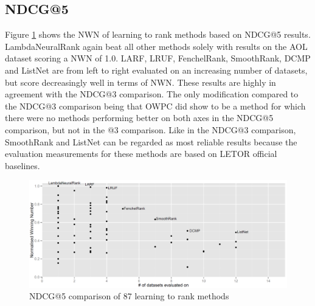 \documentclass{llncs}
\begin{document}
\subsection{NDCG@5}
Figure \ref{fig:normalized_winning_number_ndcg5} shows the NWN of learning to rank methods based on NDCG@5 results. LambdaNeuralRank again beat all other methods solely with results on the AOL dataset scoring a NWN of 1.0. LARF, LRUF, FenchelRank, SmoothRank, DCMP and ListNet are from left to right evaluated on an increasing number of datasets, but score decreasingly well in terms of NWN. These results are highly in agreement with the NDCG@3 comparison. The only modification compared to the NDCG@3 comparison being that OWPC did show to be a method for which there were no methods performing better on both axes in the NDCG@5 comparison, but not in the @3 comparison. Like in the NDCG@3 comparison, SmoothRank and ListNet can be regarded as most reliable results because the evaluation measurements for these methods are based on LETOR official baselines.
\vspace{-0.08in}
\begin{figure}
\centering
\includegraphics[scale=0.19]{gfx/ndcg5_winnum}
\caption{NDCG@5 comparison of 87 learning to rank methods}
\label{fig:normalized_winning_number_ndcg5}
\end{figure}
\vspace{-0.2in}
\end{document}
